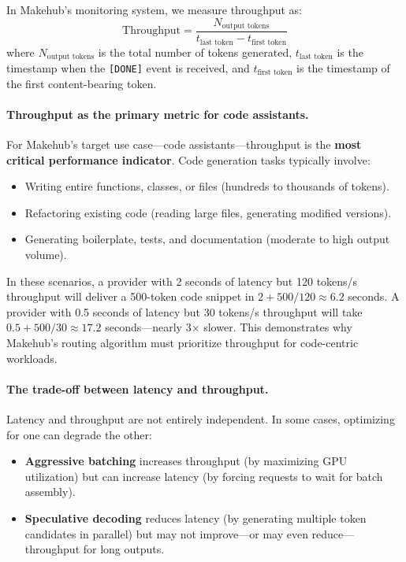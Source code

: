 \documentclass[english]{article}
\begin{document}
In Makehub's monitoring system, we measure throughput as:
\[
\text{Throughput} = \frac{N_{\text{output tokens}}}{t_{\text{last token}} - t_{\text{first token}}}
\]
where $N_{\text{output tokens}}$ is the total number of tokens generated, $t_{\text{last token}}$ is the timestamp when the \texttt{[DONE]} event is received, and $t_{\text{first token}}$ is the timestamp of the first content-bearing token.

\paragraph{Throughput as the primary metric for code assistants.}

For Makehub's target use case—code assistants—throughput is the \textbf{most critical performance indicator}. Code generation tasks typically involve:
\begin{itemize}
    \item Writing entire functions, classes, or files (hundreds to thousands of tokens).
    \item Refactoring existing code (reading large files, generating modified versions).
    \item Generating boilerplate, tests, and documentation (moderate to high output volume).
\end{itemize}

In these scenarios, a provider with 2 seconds of latency but 120 tokens/s throughput will deliver a 500-token code snippet in $2 + 500/120 \approx 6.2$ seconds. A provider with 0.5 seconds of latency but 30 tokens/s throughput will take $0.5 + 500/30 \approx 17.2$ seconds—nearly 3× slower. This demonstrates why Makehub's routing algorithm must prioritize throughput for code-centric workloads.

\paragraph{The trade-off between latency and throughput.}

Latency and throughput are not entirely independent. In some cases, optimizing for one can degrade the other:
\begin{itemize}
    \item \textbf{Aggressive batching} increases throughput (by maximizing GPU utilization) but can increase latency (by forcing requests to wait for batch assembly).
    \item \textbf{Speculative decoding} reduces latency (by generating multiple token candidates in parallel) but may not improve—or may even reduce—throughput for long outputs.
\end{itemize}
\end{document}
